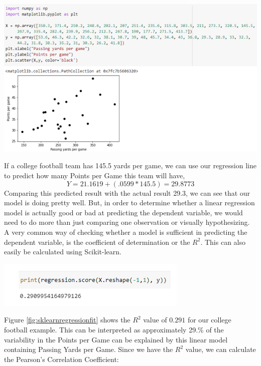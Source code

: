 \documentclass[a4paper,12pt]{report}
\begin{document}
\begin{center}
    \captionsetup{type=figure}
    \includegraphics[width=.9\linewidth]{media/scatterplotmatplot.png}
    \label{fig:scatterplotmatplot}
\end{center}

If a college football team has 145.5 yards per game, we can use our regression line to predict how many Points per Game this team will have, 
$$Y=21.1619+(.0599*145.5)=29.8773$$
Comparing this predicted result with the actual result 29.3, we can see that our model is doing pretty well. But, in order to determine whether a linear regression model is actually good or bad at predicting the dependent variable, we would need to do more than just comparing one observation or visually hypothesizing. A very common way of checking whether a model is sufficient in predicting the dependent variable, is the coefficient of determination or the $R^2$. This can also easily be calculated using Scikit-learn. 

\begin{center}
    \captionsetup{type=figure}
    \includegraphics[width=.9\linewidth]{media/printregression.png}
\end{center}

Figure \ref{fig:sklearnregressionfit} shows the $R^2$ value of $0.291$ for our college football example. This can be interpreted as approximately 29.\% of the variability in the Points per Game can be explained by this linear model containing Passing Yards per Game. Since we have the $R^2$ value, we can calculate the Pearson’s Correlation Coefficient:
\end{document}
